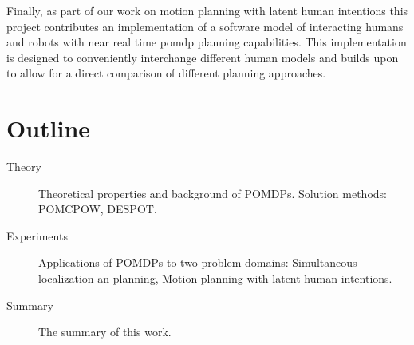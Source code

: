 Finally, as part of our work on motion planning with latent human intentions
this project contributes an implementation of a software model of interacting
humans and robots with near real time \ac{pomdp} planning capabilities. This
implementation is designed to conveniently interchange different human models
and builds upon \pomdpsjl to allow for a direct comparison of different
planning approaches.

\section{Outline}

\begin{description}
  \item[Theory] Theoretical properties and background of POMDPs. Solution methods: POMCPOW, DESPOT.
  \item[Experiments] Applications of POMDPs to two problem domains: Simultaneous localization an planning, Motion planning with latent human intentions.
  \item[Summary] The summary of this work.
\end{description}
